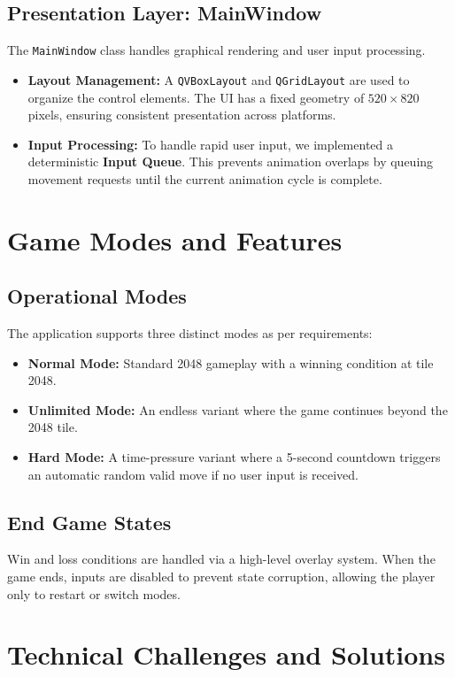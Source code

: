 \documentclass[11pt,a4paper]{article}
\begin{document}
\subsection{Presentation Layer: MainWindow}
The \texttt{MainWindow} class handles graphical rendering and user input processing.
\begin{itemize}
    \item \textbf{Layout Management:} A \texttt{QVBoxLayout} and \texttt{QGridLayout} are used to organize the control elements. The UI has a fixed geometry of $520 \times 820$ pixels, ensuring consistent presentation across platforms.
    \item \textbf{Input Processing:} To handle rapid user input, we implemented a deterministic \textbf{Input Queue}. This prevents animation overlaps by queuing movement requests until the current animation cycle is complete.
\end{itemize}

\section{Game Modes and Features}

\subsection{Operational Modes}
The application supports three distinct modes as per requirements:
\begin{itemize}
    \item \textbf{Normal Mode:} Standard 2048 gameplay with a winning condition at tile 2048.
    \item \textbf{Unlimited Mode:} An endless variant where the game continues beyond the 2048 tile.
    \item \textbf{Hard Mode:} A time-pressure variant where a 5-second countdown triggers an automatic random valid move if no user input is received.
\end{itemize}

\subsection{End Game States}
Win and loss conditions are handled via a high-level overlay system. When the game ends, inputs are disabled to prevent state corruption, allowing the player only to restart or switch modes.

\section{Technical Challenges and Solutions}
\end{document}
